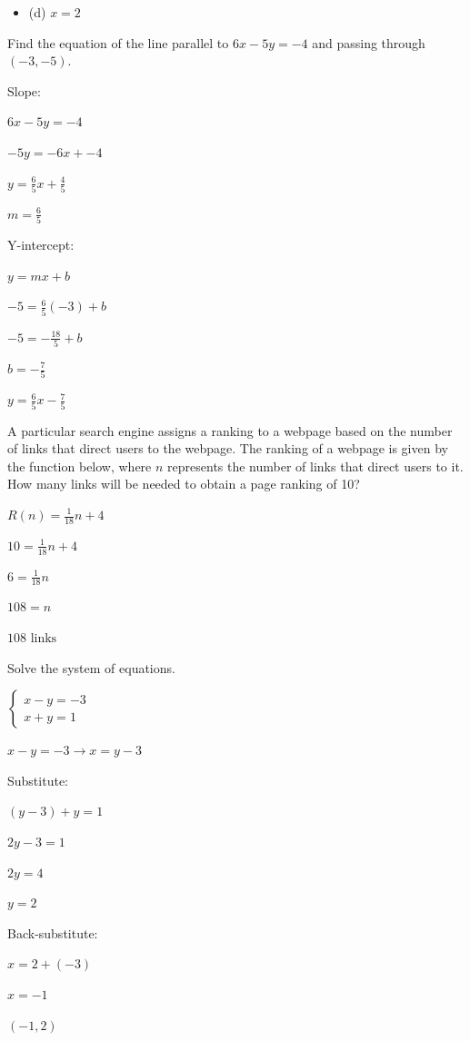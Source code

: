 \documentclass[addpoints,12pt,answers]{exam}
\begin{document}
\begin{questions}
\begin{solution}
\begin{itemize}
\item
(d) \(x = 2\)

\end{itemize}
\end{solution}


\question[5] Find the equation of the line parallel to $6x - 5y = -4$ and passing through $(-3, -5)$.
\begin{solution}
Slope:

 $6x - 5y = -4$ 

 $-5y = -6x + -4$ 

 $y = \frac{6}{5}x + \frac{4}{5}$ 

 $m = \frac{6}{5}$ 

Y-intercept:

 $y = mx + b$ 

 $-5 = \frac{6}{5}(-3) + b$ 

 $-5 = -\frac{18}{5} + b$ 

 $b = -\frac{7}{5}$ 

 $\boxed{ y = \frac{6}{5}x - \frac{7}{5} }$
\end{solution}
\answerline

\newpage

\question[5] A particular search engine assigns a ranking to a webpage based on the number of links that direct users to the webpage. The ranking of a webpage is given by the function below, where $n$ represents the number of links that direct users to it. How many links will be needed to obtain a page ranking of 10? 

 $R(n) = \frac{1}{18}n + 4$
\begin{solution}
$10 = \frac{1}{18}n + 4$ 

 $6 = \frac{1}{18}n$ 

 $108 = n$ 

 $\boxed{ 108 \text{ links} }$
\end{solution}
\answerline


\question[5] Solve the system of equations. 

 $\begin{cases} x - y = -3 \\ x + y = 1 \end{cases}$
\begin{solution}
$x - y = -3 \to x = y - 3$ 

Substitute:

 $(y - 3) + y = 1$ 

 $2y - 3 = 1$ 

 $2y = 4$ 

 $y = 2$ 

Back-substitute:

 $x = 2 + (-3)$ 

 $x = -1$ 

 $\boxed{ (-1, 2) }$
\end{solution}
\answerline


\end{questions}
\end{document}
